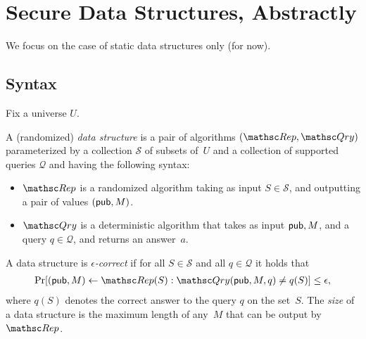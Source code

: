 \section{Secure Data Structures, Abstractly}
We focus on the case of static data structures only (for now).
\def\pub{{\sf pub}}

\subsection{Syntax}
Fix a universe $U$.

\begin{definition}
A (randomized) \emph{data structure} is a pair of algorithms $(\Rep, \Qry)$
parameterized by a collection $\mathcal{S}$ of subsets of~$U$ and a collection
of supported queries $\mathcal{Q}$ and having the following syntax:
\begin{itemize}
\item $\Rep$ is a randomized algorithm taking as input $S \in \mathcal{S}$,
and outputting a pair of values $(\pub, M)$.
\item $\Qry$ is a deterministic algorithm that takes as input $\pub, M$,
and a query $q\in \mathcal{Q}$, and returns an answer~$a$.
\end{itemize}
A data structure is \emph{$\epsilon$-correct} if for all $S \in \mathcal{S}$ and
all $q \in \mathcal{Q}$ it holds that
\begin{eqnarray}
\Pr[(\pub, M) \leftarrow \Rep(S) : \Qry(\pub, M, q) \neq q(S)] \leq \epsilon, \label{eqn:correctness}
\end{eqnarray}
where $q(S)$ denotes the correct answer to the query $q$ on the set~$S$.
The \emph{size} of a data structure is the maximum length of any~$M$ that can be
output by $\Rep$. 
 
\end{definition}

